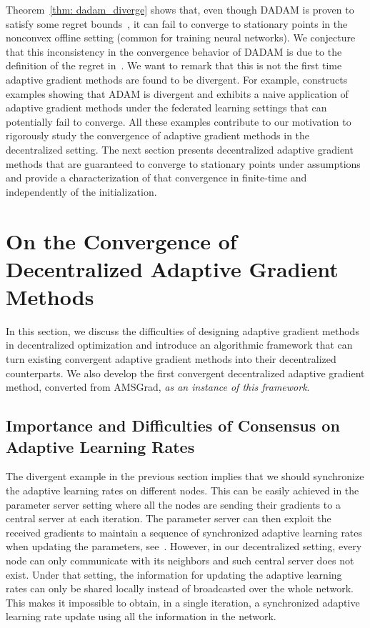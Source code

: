 \documentclass[11pt]{article}
\begin{document}
Theorem~\ref{thm: dadam_diverge} shows that, even though DADAM is proven to satisfy some regret bounds~\citep{nazari2019dadam}, it can fail to converge to stationary points in the nonconvex offline setting (common for training neural networks). 
We conjecture that this inconsistency in the convergence behavior of DADAM is due to the definition of the regret in~\citet{nazari2019dadam}. We want to remark that this is not the first time adaptive gradient methods are found to be divergent. 
For example, \citet{reddi2019convergence} constructs examples showing that ADAM is divergent and \citet{chen2020toward} exhibits a naive application of adaptive gradient methods under the federated learning settings that can potentially fail to converge. 
All these examples contribute to our motivation to rigorously study the convergence of adaptive gradient methods in the decentralized setting. 
The next section presents decentralized adaptive gradient methods that are guaranteed to converge to stationary points under  assumptions and provide a characterization of that convergence in finite-time and independently of the initialization.


\section{On the Convergence of Decentralized Adaptive Gradient Methods}\label{sec:main}


In this section, we discuss the difficulties of designing adaptive gradient methods in decentralized optimization and introduce an algorithmic framework that can turn existing convergent adaptive gradient methods into their decentralized counterparts. 
We also develop the first convergent decentralized adaptive gradient method, converted from AMSGrad, \emph{as an instance of this  framework}.


\subsection{Importance and Difficulties of Consensus on Adaptive Learning Rates}


The divergent example in the previous section implies that we should synchronize the adaptive learning rates on different nodes. 
This can be easily achieved in the parameter server setting where all the nodes are sending their gradients to a central server at each iteration.
The parameter server can then exploit the received gradients to maintain a sequence of synchronized adaptive learning rates when updating the parameters, see~\citep{reddi2020adaptive}.
However, in our decentralized setting, every node can only communicate with its neighbors and such central server does not exist.
Under that setting, the information for updating the adaptive learning rates can only be shared locally instead of broadcasted over the whole network.
This makes it impossible to obtain, in a single iteration, a synchronized adaptive learning rate update using all the information in the network. 
\end{document}
